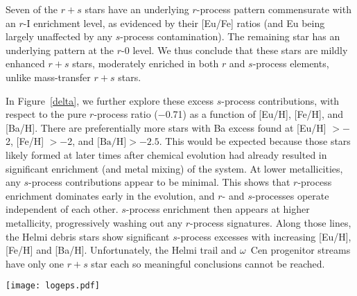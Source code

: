 \documentclass[twocolumn]{aastex63}
\begin{document}
Seven of the $r+s$ stars have an underlying $r$-process pattern commensurate with an $r$-I enrichment level, as evidenced by their [Eu/Fe] ratios (and Eu being largely unaffected by any $s$-process contamination). The remaining star has an underlying pattern at the $r$-0 level. We thus conclude that these stars are mildly enhanced $r+s$ stars, moderately enriched in both $r$ and $s$-process elements, unlike mass-transfer $r+s$ stars.




In Figure~\ref{delta}, we further explore these excess $s$-process contributions, with respect to the pure $r$-process ratio ($-$0.71) as a function of [Eu/H], [Fe/H], and [Ba/H]. There are preferentially more stars with Ba excess found at [Eu/H] $>-$2, [Fe/H] $>-$2, and $\mbox{[Ba/H]} >-2.5$. This would be expected because those stars likely formed at later times after chemical evolution had already resulted in significant enrichment (and metal mixing) of the system. At lower metallicities, any $s$-process contributions appear to be minimal. This shows that $r$-process enrichment dominates early in the evolution, and $r$- and $s$-processes operate independent of each other. $s$-process enrichment then appears at higher metallicity, progressively washing out any $r$-process signatures.  Along those lines, the Helmi debris stars show significant $s$-process excesses with increasing [Eu/H], [Fe/H] and [Ba/H]. Unfortunately, the Helmi trail and $\omega$~Cen progenitor streams have only one $r+s$ star each so meaningful conclusions cannot be reached. 



\begin{figure*}[!t]
 \begin{center}
  \texttt{[image: logeps.pdf]} 
 \end{center}
\end{figure*}
\end{document}
